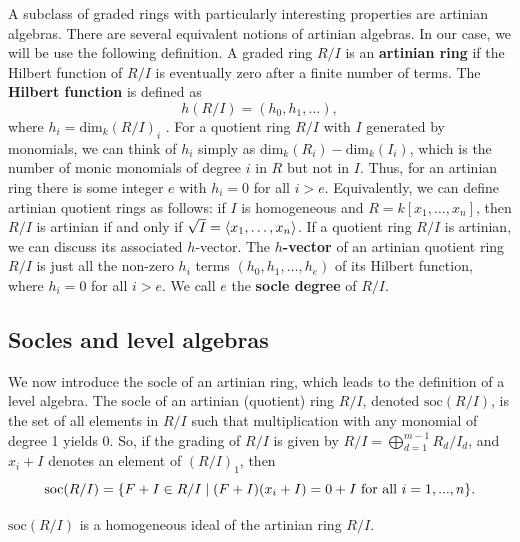 A subclass of graded rings with particularly interesting properties are artinian algebras. There are several equivalent notions of artinian algebras. In our case, we will be use the following definition. A graded ring $R/I$ is an \textbf{artinian ring} if the Hilbert function of $R/I$ is eventually zero after a finite number of terms. The \textbf{Hilbert function} is defined as
$$
h(R/I) = (h_0, h_1, ...),
$$
where $h_i = \textrm{dim}_k (R/I)_i$ \cite{Stanley1978}. For a quotient ring $R/I$ with $I$ generated by monomials, we can think of $h_i$ simply as $\textrm{dim}_k (R_i) - \textrm{dim}_k(I_i)$, which is the number of monic monomials of degree $i$ in $R$ but not in $I$. Thus, for an artinian ring there is some integer $e$ with $h_i = 0$ for all $i > e$. Equivalently, we can define artinian quotient rings as follows: if $I$ is homogeneous and $R = k[x_1, \dots, x_n]$, then $R/I$ is artinian if and only if $\sqrt{I} = \langle x_1, \dots, x_n \rangle$. If a quotient ring $R/I$ is artinian, we can discuss its associated $h$-vector. The \textbf{$h$-vector} of an artinian quotient ring $R/I$ is just all the non-zero $h_i$ terms $(h_0, h_1, \dots, h_e)$ of its Hilbert function, where $h_i =0$ for all $i > e$. We call $e$ the \textbf{socle degree} of $R/I$. 

\subsection{Socles and level algebras} \label{sec:socles}
\label{socles-level}
We now introduce the socle of an artinian ring, which leads to the definition of a level algebra. The socle of an artinian (quotient) ring $R/I$, denoted $\textrm{soc}(R/I)$, is the set of all elements in $R/I$ such that multiplication with any monomial of degree 1 yields 0. So, if the grading of $R/I $ is given by $R/I = \bigoplus\limits_{d = 1}^{m-1} R_d / I_d$, and $x_i + I$ denotes an element of $(R/ I)_1$, then
$$
\textrm{soc}(R/I) = \{ F+I \in R/I \; | \; (F+I)(x_i + I) = 0 + I \textrm{ for all } i  = 1, ..., n \}.
$$

\begin{lemma} 
$\textrm{soc}(R/I)$ is a homogeneous ideal of the artinian ring $R/I$.
\end{lemma}

